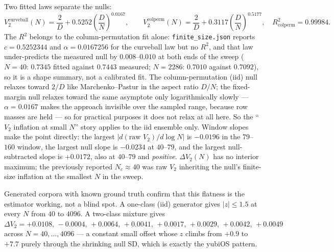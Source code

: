 \documentclass[11pt,a4paper]{article}
\theoremstyle{plain}
\theoremstyle{remark}
\theoremstyle{plain}
\begin{document}
Two fitted laws separate the nulls:
\begin{equation}
V_2^{\mathrm{curveball}}(N)=\frac{2}{D}+0.5252\left(\frac{D}{N}\right)^{0.0167},
\qquad
V_2^{\mathrm{colperm}}(N)=\frac{2}{D}+0.3117\left(\frac{D}{N}\right)^{0.5177},\quad R^2_{\mathrm{colperm}}=0.99984 .
\label{eq:finitesize}
\end{equation}
The $R^2$ belongs to the column-permutation fit alone: \texttt{finite\_size.json} reports $c=0.5252344$ and $\alpha=0.0167256$ for the curveball law but no $R^2$, and that law under-predicts the measured null by $0.008$--$0.010$ at both ends of the sweep ($N=40$: $0.7345$ fitted against $0.7443$ measured; $N=2286$: $0.7010$ against $0.7092$), so it is a shape summary, not a calibrated fit. The column-permutation (iid) null relaxes toward $2/D$ like Marchenko--Pastur in the aspect ratio $D/N$; the fixed-margin null relaxes toward the same asymptote only logarithmically slowly --- $\alpha=0.0167$ makes the approach invisible over the sampled range, because row masses are held --- so for practical purposes it does not relax at all here. So the ``$V_2$ inflation at small $N$'' story applies to the iid ensemble only. Window slopes make the point directly: the largest $|d(\text{raw }V_2)/d\log N|$ is $-0.0196$ in the $79$--$160$ window, the largest null slope is $-0.0234$ at $40$--$79$, and the largest null-subtracted slope is $+0.0172$, also at $40$--$79$ and \emph{positive}. $\Delta V_2(N)$ has no interior maximum; the previously reported $N_c\approx40$ was raw $V_2$ inheriting the null's finite-size inflation at the smallest $N$ in the sweep.

Generated corpora with known ground truth confirm that this flatness is the estimator working, not a blind spot. A one-class (iid) generator gives $|z|\le1.5$ at every $N$ from $40$ to $4096$. A two-class mixture gives $\Delta V_2=+0.0108,\,-0.0004,\,+0.0064,\,+0.0041,\,+0.0017,\,+0.0029,\,+0.0042,\,+0.0049$ across $N=40,\dots,4096$ --- a constant small offset whose $z$ climbs from $+0.9$ to $+7.7$ purely through the shrinking null SD, which is exactly the yubiOS pattern.
\end{document}
